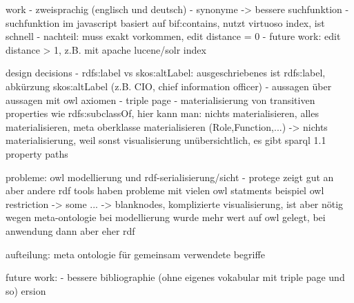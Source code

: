 \documentclass[14pt,aspectratio=1610]{beamer}
\begin{document}

work
- zweisprachig (englisch und deutsch)
- synonyme -> bessere suchfunktion
- suchfunktion im javascript basiert auf bif:contains, nutzt virtuoso index, ist schnell
- nachteil: muss exakt vorkommen, edit distance = 0
- future work: edit distance > 1, z.B. mit apache lucene/solr index


design decisions
- rdfs:label vs skos:altLabel: ausgeschriebenes ist rdfs:label, abkürzung skos:altLabel (z.B. CIO, chief information officer)
- aussagen über aussagen mit owl axiomen
- triple page
- materialisierung von transitiven properties wie rdfs:subclassOf, hier kann man: nichts materialisieren, alles materialisieren, meta oberklasse materialisieren (Role,Function,...)
-> nichts materialisierung, weil sonst visualisierung unübersichtlich, es gibt sparql 1.1 property paths


probleme:
owl modellierung und rdf-serialisierung/sicht
- protege zeigt gut an aber andere rdf tools haben probleme mit vielen owl statments
beispiel owl restriction -> some ... -> blanknodes, komplizierte visualisierung, ist aber nötig wegen meta-ontologie
bei modellierung wurde mehr wert auf owl gelegt, bei anwendung dann aber eher rdf

aufteilung:
meta ontologie für gemeinsam verwendete begriffe


future work:
- bessere bibliographie (ohne eigenes vokabular mit triple page und so)
ersion
\end{document}
